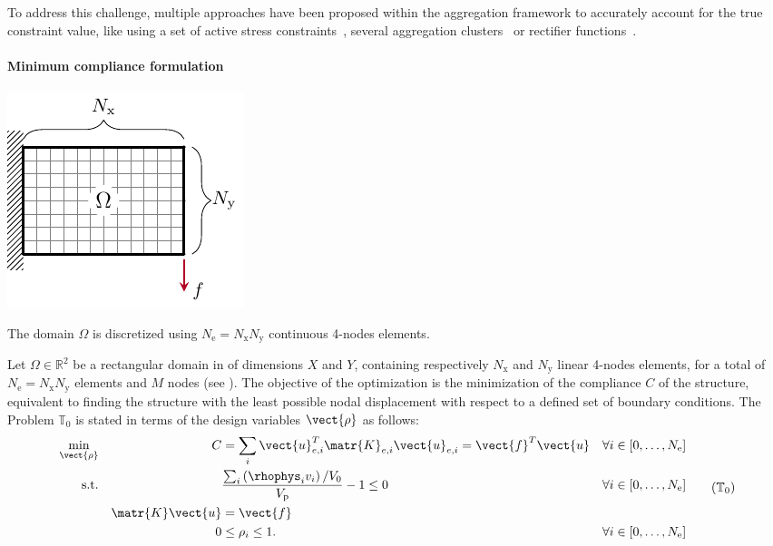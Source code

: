 To address this challenge, multiple approaches have been proposed within the aggregation framework to accurately account for the true constraint value, like using a set of active stress constraints~, several aggregation clusters~ or rectifier functions~.

\paragraph{Minimum compliance formulation}
\begin{marginfigure}
    \centering
    \includegraphics{figures/03_comparison_TO_TTO/01_contin_mesh/c_mesh.pdf}
    \caption{The domain $\Omega$ is discretized using $N_\text{e}=N_\text{x} N_\text{y}$ continuous 4-nodes elements.}
    \label{fig:03_mesh_c}
\end{marginfigure}
Let $\Omega \in \mathbb{R}^2$ be a rectangular domain in of dimensions $X$ and $Y$, containing respectively $N_\text{x}$ and $N_\text{y}$ linear 4-nodes elements, for a total of $N_\text{e}=N_\text{x} N_\text{y}$ elements and $M$ nodes (see ). The objective of the optimization is the minimization of the compliance $C$ of the structure, equivalent to finding the structure with the least possible nodal displacement with respect to a defined set of boundary conditions. The Problem $\mathbb{T}_0$ is stated in terms of the design variables $\vect{\rho}$ as follows:
\begin{equation}
    \begin{aligned}
    \min_{\vect{\rho}}         && C &= \sum_{i} \vect{u}_{e,i}^T \matr{K}_{e,i} \vect{u}_{e,i}=\vect{f}^T\vect{u}&& \forall i \in [0,\dots,N_\text{e}]                         \\
    \textrm{s.t.}   && & \frac{\sum_{i} \left(\rhophys_i v_i \right) / V_0}{V_\text{p}} - 1 \leq 0 && \forall i \in [0,\dots,N_\text{e}] \\
    && \matr{K}\vect{u} &= \vect{f} &&\\
    && 0 &\leq \rho_i \leq 1. && \forall i \in [0,\dots,N_\text{e}] \\
    \end{aligned}
    \tag{$\mathbb{T}_0$}
    \label{eq:03_prob-comp}
\end{equation}

